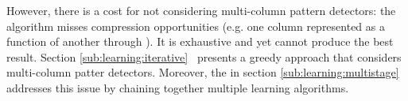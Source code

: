 However, there is a cost for not considering multi-column pattern detectors: the algorithm misses compression opportunities (e.g. one column represented as a function of another through ). It is exhaustive and yet cannot produce the best result. Section \ref{sub:learning:iterative}~ presents a greedy approach that considers multi-column patter detectors. Moreover, the  in section \ref{sub:learning:multistage} addresses this issue by chaining together multiple learning algorithms.

